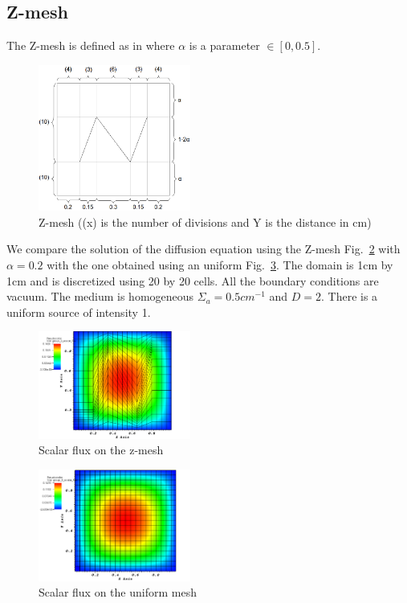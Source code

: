\documentclass[preprint,10pt]{elsarticle}
\newcommand{\fig}[1]{Fig.~\ref{#1}}                      %
\renewcommand{\(}{\left(}
\renewcommand{\)}{\right)}
\renewcommand{\[}{\left[}
\renewcommand{\]}{\right]}
\begin{document}
\subsection{Z-mesh}
The Z-mesh is defined as in  where $\alpha$ is a parameter
$\in [0,0.5]$. 
\begin{figure}[H]
  \centering
  \includegraphics[width=5cm]{z_mesh}
  \caption{Z-mesh ((x) is the number of divisions and Y is the distance in cm)}
  \label{fig_z_mesh}
\end{figure}    
We compare the solution of the diffusion equation using the Z-mesh
\fig{z_mesh_sol} with $\alpha=0.2$ with the one obtained using an uniform \fig{u_mesh_sol}. 
The domain is 1cm by 1cm and is discretized using 20 by 20 cells. All the 
boundary conditions are vacuum. The medium is homogeneous $\Sigma_a = 0.5 cm^{-1}$ 
and $D=2$. There is a uniform source of intensity 1.                  
\begin{figure}[H]
  \centering
  \includegraphics[width=5cm]{z_mesh_sol}
  \caption{Scalar flux on the z-mesh}
  \label{z_mesh_sol}
\end{figure}
\begin{figure}[H]
  \centering
  \includegraphics[width=5cm]{pwld_uniform_sol}
  \caption{Scalar flux on the uniform mesh}
  \label{u_mesh_sol}
\end{figure}
\end{document}
